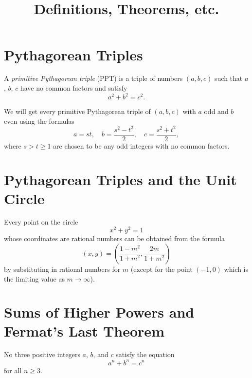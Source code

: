 \documentclass[10pt]{article}
\begin{document}
\title{\vspace{-2em}Definitions, Theorems, etc.\vspace{-1em}}
\author{}
\date{}
\maketitle
\thispagestyle{fancy}

\sectionfont{\fontsize{12}{15}\selectfont}
\vspace{-4em}
\setcounter{section}{1}
\section{Pythagorean Triples}

\begin{definition*}[\textcolor{red}{Primitive Pythagorean Triple}] A \emph{primitive Pythagorean triple} (PPT) is a triple of numbers $(a,b,c)$ such that $a$, $b$, $c$ have no common factors and satisfy
    \[a^2+b^2=c^2.\]
\end{definition*}

\begin{theorem}[\textcolor{red}{Pythagorean Triple Theorem}] We will get every primitive Pythagorean triple of $(a,b,c)$ with $a$ odd and $b$ even using the formulas
    \[a=st, \quad b=\frac{s^2-t^2}{2}, \quad c=\frac{s^2+t^2}{2},\]
    where $s > t \geq 1$ are chosen to be any odd integers with no common factors.
\end{theorem}

\section{Pythagorean Triples and the Unit Circle}

\begin{theorem} Every point on the circle
    \[x^2+y^2=1\]
    whose coordinates are rational numbers can be obtained from the formula
    \[(x,y)=\left( \frac{1-m^2}{1+m^2},\frac{2m}{1+m^2} \right) \]
    by substituting in rational numbers for $m$ (except for the point $(-1,0)$ which is the limiting value as $m \rightarrow \infty$).
\end{theorem}


\section{Sums of Higher Powers and Fermat's Last Theorem}

\begin{theorem*}[\textcolor{red}{Fermat's Last Theorem}]
No three positive integers $a$, $b$, and $c$ satisfy the equation
    \[a^n+b^n=c^n\]
    for all $n \geq 3$.
\end{theorem*}
\end{document}
